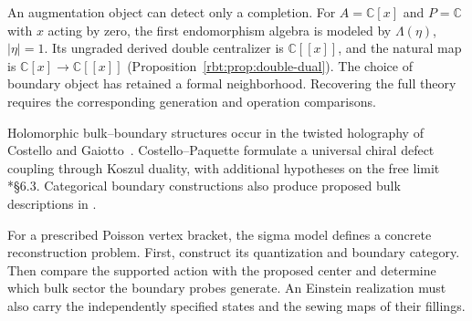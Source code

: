 An augmentation object can detect only a completion.
For \(A=\mathbb C[x]\) and \(P=\mathbb C\) with \(x\) acting
by zero, the first endomorphism algebra is modeled by
\(\Lambda(\eta)\), \(|\eta|=1\).
Its ungraded derived double centralizer is \(\mathbb C[[x]]\),
and the natural map is
\(\mathbb C[x]\to\mathbb C[[x]]\)
(Proposition~\ref{rbt:prop:double-dual}).
The choice of boundary object has retained a formal neighborhood.
Recovering the full theory requires the corresponding generation
and operation comparisons.

Holomorphic bulk--boundary structures occur in the twisted holography
of Costello and Gaiotto~\cite{hol:CG}.
Costello--Paquette formulate a universal chiral defect coupling
through Koszul duality, with additional hypotheses on the free limit
\cite{hol:CP}*{\S6.3}. Categorical boundary constructions also
produce proposed bulk descriptions in \cite{hol:categorical}.

For a prescribed Poisson vertex bracket, the sigma model defines
a concrete reconstruction problem.
First, construct its quantization and boundary category.
Then compare the supported action with the proposed center and
determine which bulk sector the boundary probes generate.
An Einstein realization must also carry the independently specified
states and the sewing maps of their fillings.
